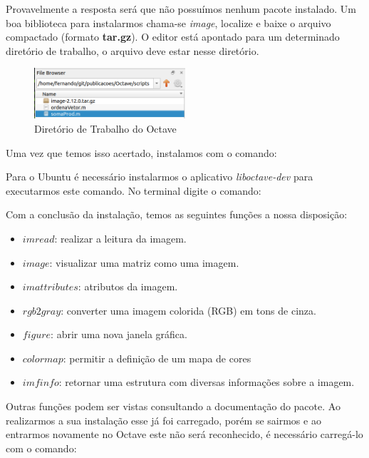 \documentclass[a4paper,11pt]{article}
\begin{document}
Provavelmente a resposta será que não possuímos nenhum pacote instalado. Um boa biblioteca para instalarmos chama-se \textit{image}, localize e baixe o arquivo compactado (formato \textbf{tar.gz}). O editor está apontado para um determinado diretório de trabalho, o arquivo deve estar nesse diretório.
\begin{figure}[H]
	\centering
	\includegraphics[width=0.5\textwidth]{imagem/diretorio}
	\caption{Diretório de Trabalho do Octave}
\end{figure}

Uma vez que temos isso acertado, instalamos com o comando: \\

\begin{theo}[No Ubuntu]{}
	Para o Ubuntu é necessário instalarmos o aplicativo \textit{liboctave-dev} para executarmos este comando. No terminal digite o comando: 
\end{theo}

Com a conclusão da instalação, temos as seguintes funções a nossa disposição:
\begin{itemize}[nolistsep]
	\item $imread$: realizar a leitura da imagem.
	\item $image$: visualizar uma matriz como uma imagem.
	\item $imattributes$: atributos da imagem.
	\item $rgb2gray$: converter uma imagem colorida (RGB) em tons de cinza.
	\item $figure$: abrir uma nova janela gráfica.
	\item $colormap$: permitir a definição de um mapa de cores	
	\item $imfinfo$: retornar uma estrutura com diversas informações sobre a imagem.
\end{itemize}

Outras funções podem ser vistas consultando a documentação do pacote. Ao realizarmos a sua instalação esse já foi carregado, porém se sairmos e ao entrarmos novamente no Octave este não será reconhecido, é necessário carregá-lo com o comando: \\
\end{document}
